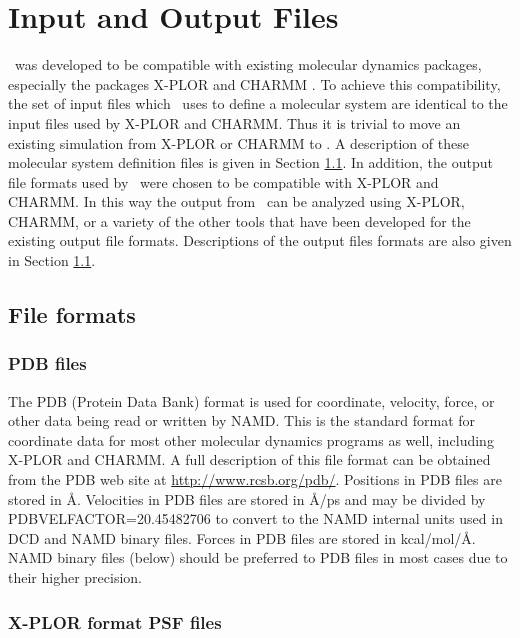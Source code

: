 
\section{Input and Output Files}
\label{section:files}

\NAMD\ was developed to be compatible with existing 
molecular dynamics packages, 
especially the packages X-PLOR 
and CHARMM .  
To achieve this compatibility,
the set of input files which \NAMD\ uses to define 
a molecular system are identical to the input files used by X-PLOR and CHARMM.  
Thus it is trivial to move an existing simulation from
X-PLOR or CHARMM to \NAMD.
A description of these molecular system definition 
files is given in Section \ref{section:formats}.  
\prettypar
In addition, the output file formats used by \NAMD\ 
were chosen to be compatible with X-PLOR and CHARMM.  
In this way the output from \NAMD\ can be analyzed using
X-PLOR, CHARMM, or a variety of the other tools that have 
been developed for the existing output file formats.  
Descriptions of the output files formats are also given in 
Section \ref{section:formats}.


\subsection{File formats}
\label{section:formats}

\subsubsection{PDB files}
The PDB (Protein Data Bank) format is used for
coordinate, velocity, force, or other data 
being read or written by NAMD.
This is the standard format for coordinate data
for most other molecular dynamics programs as well, including X-PLOR and CHARMM.
A full description of this file format can be obtained from the PDB web site
at \url{http://www.rcsb.org/pdb/}.
Positions in PDB files are stored in \AA.
Velocities in PDB files are stored in \AA/ps and may be
divided by PDBVELFACTOR=20.45482706
to convert to the NAMD internal units used in DCD and NAMD binary files.
Forces in PDB files are stored in kcal/mol/\AA.
NAMD binary files (below) should be preferred to PDB files
in most cases due to their higher precision.

\subsubsection{X-PLOR format PSF files}

